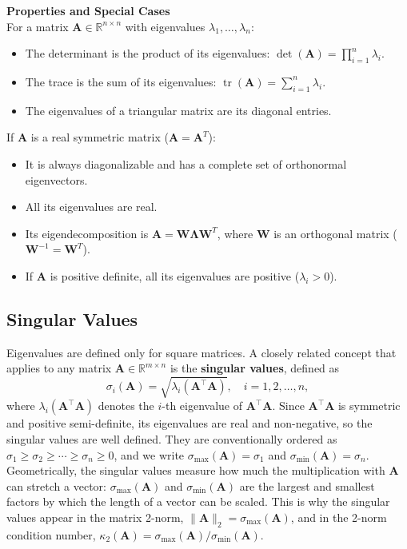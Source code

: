 \begin{theoremBox}
    \textbf{Properties and Special Cases} \\
    For a matrix $\mathbf{A} \in \mathbb{R}^{n \times n}$ with eigenvalues $\lambda_1, \dots, \lambda_n$:
    \begin{itemize}
        \item The determinant is the product of its eigenvalues: $\det(\mathbf{A}) = \prod_{i=1}^n \lambda_i$.
        \item The trace is the sum of its eigenvalues: $\operatorname{tr}(\mathbf{A}) = \sum_{i=1}^n \lambda_i$.
        \item The eigenvalues of a triangular matrix are its diagonal entries.
    \end{itemize}
    If $\mathbf{A}$ is a real symmetric matrix ($\mathbf{A} = \mathbf{A}^T$):
    \begin{itemize}
        \item It is always diagonalizable and has a complete set of orthonormal eigenvectors.
        \item All its eigenvalues are real.
        \item Its eigendecomposition is $\mathbf{A} = \mathbf{W} \mathbf{\Lambda} \mathbf{W}^T$, where $\mathbf{W}$ is an orthogonal matrix ($\mathbf{W}^{-1} = \mathbf{W}^T$).
        \item If $\mathbf{A}$ is positive definite, all its eigenvalues are positive ($\lambda_i > 0$).
    \end{itemize}
\end{theoremBox}


\subsection{Singular Values}\label{sec:singular-values}
Eigenvalues are defined only for square matrices.
A closely related concept that applies to any matrix $\mathbf{A} \in \mathbb{R}^{m \times n}$ is the \textbf{singular values}, defined as
\begin{equation*}
    \sigma_i(\mathbf{A}) = \sqrt{\lambda_i(\mathbf{A}^\top \mathbf{A})}, \quad i = 1, 2, \dots, n,
\end{equation*}
where $\lambda_i(\mathbf{A}^\top \mathbf{A})$ denotes the $i$-th eigenvalue of $\mathbf{A}^\top \mathbf{A}$.
Since $\mathbf{A}^\top \mathbf{A}$ is symmetric and positive semi-definite, its eigenvalues are real and non-negative, so the singular values are well defined.
They are conventionally ordered as $\sigma_1 \geq \sigma_2 \geq \cdots \geq \sigma_n \geq 0$, and we write $\sigma_{\max}(\mathbf{A}) = \sigma_1$ and $\sigma_{\min}(\mathbf{A}) = \sigma_n$.
Geometrically, the singular values measure how much the multiplication with $\mathbf{A}$ can stretch a vector: $\sigma_{\max}(\mathbf{A})$ and $\sigma_{\min}(\mathbf{A})$ are the largest and smallest factors by which the length of a vector can be scaled.
This is why the singular values appear in the matrix 2-norm, $\|\mathbf{A}\|_2 = \sigma_{\max}(\mathbf{A})$, and in the 2-norm condition number, $\kappa_2(\mathbf{A}) = \sigma_{\max}(\mathbf{A})/\sigma_{\min}(\mathbf{A})$.

